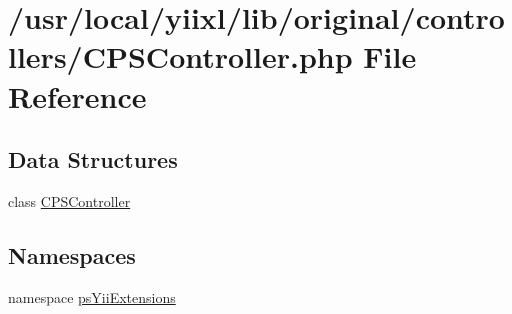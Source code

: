 \hypertarget{CPSController_8php}{
\section{/usr/local/yiixl/lib/original/controllers/CPSController.php File Reference}
\label{CPSController_8php}
}
\subsection*{Data Structures}
\begin{DoxyCompactItemize}
\item 
class \hyperlink{classCPSController}{CPSController}
\end{DoxyCompactItemize}
\subsection*{Namespaces}
\begin{DoxyCompactItemize}
\item 
namespace \hyperlink{namespacepsYiiExtensions}{psYiiExtensions}
\end{DoxyCompactItemize}
